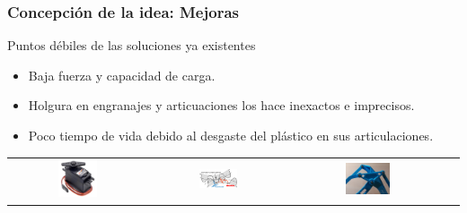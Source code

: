 \documentclass{beamer}
\begin{document}
\begin{frame}
  \frametitle{Concepción de la idea: Mejoras}
  \begin{block}{Puntos débiles de las soluciones ya existentes}
    \begin{itemize}
    \item Baja fuerza y capacidad de carga.
    \item Holgura en engranajes y articuaciones los hace inexactos e imprecisos.
    \item Poco tiempo de vida debido al desgaste del plástico en sus articulaciones.
    \end{itemize}
  \end{block}

  \begin{table}[htbp]
    \centering
    \begin{tabular}{cccc}
        \includegraphics[width=0.3\textwidth, valign=m]{figs/servo.jpg} & \includegraphics[width=0.3\textwidth, valign=m]{figs/holgura.png} 
        & \includegraphics[width=0.3\textwidth, valign=m]{figs/friccion.jpg}
        
    \end{tabular}
  \end{table} 

\end{frame}
\end{document}
